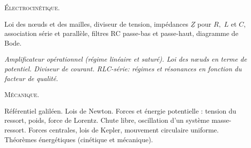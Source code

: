 \documentclass[12pt,fancy]{cours}
\begin{document}
\begin{enumerate}
\medskip
\item \textsc{Électrocinétique}.
\item[\Note] Loi des nœuds et des mailles, diviseur de tension, impédances $\underline{Z}$ pour $R,$ $L$ et $C$, association série et parallèle, filtres RC passe-bas et passe-haut, diagramme de Bode.
{\small
\item[\Nnote] \emph{Amplificateur opérationnel (régime linéaire et saturé). Loi des nœuds en terme de potentiel. Diviseur de courant. RLC-série: régimes et résonances en fonction du facteur de qualité.}
}
\medskip
\item \textsc{Mécanique}.
\item[\Note] Référentiel galiléen. Lois de Newton. Forces et énergie potentielle : tension du ressort, poids, force de Lorentz. Chute libre, oscillation d'un système masse-ressort. Forces centrales, lois de Kepler, mouvement circulaire uniforme. Théorèmes énergétiques (cinétique et mécanique).



\end{enumerate}
\end{document}
